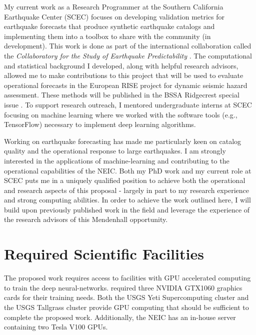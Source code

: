 \documentclass[12p]{article}
\begin{document}
My current work as a Research Programmer at the Southern California Earthquake Center (SCEC) focuses on developing
validation metrics for earthquake forecasts that produce synthetic earthquake catalogs and implementing them into a
toolbox to share with the community (in development). This work is done as part of the international collaboration
called the \emph{Collaboratory for the Study of Earthquake Predictability} \citep{Jordan2006, Schorlemmer2007b}. The
computational and statistical background I developed, along with helpful research advisors, allowed me to make
contributions to this project that will be used to evaluate operational forecasts in the European RISE project for
dynamic seismic hazard assessment. These methods will be published in the BSSA Ridgecrest special issue
\citep{Savran2020}. To support research outreach, I mentored undergraduate interns at SCEC focusing on machine learning where we worked with the software tools (e.g., TensorFlow) necessary to implement deep learning algorithms.

Working on earthquake forecasting has made me particularly keen on catalog quality and the operational response to large
earthquakes. I am strongly interested in the applications of machine-learning and contributing to the operational
capabilities of the NEIC. Both my PhD work and my current role at SCEC puts me in a uniquely qualified position to
achieve both the operational and research aspects of this proposal - largely in part to my research experience and
strong computing abilities. In order to achieve the work outlined here, I will build upon previously published work in
the field and leverage the experience of the research advisors of this Mendenhall opportunity.

\section{Required Scientific Facilities}
The proposed work requires access to facilities with GPU accelerated computing to train the deep neural-networks.
\citet{Ross2018b} required three NVIDIA GTX1060 graphics cards for their training needs. Both the USGS Yeti
Supercomputing cluster and the USGS Tallgrass cluster provide GPU computing that should be sufficient to complete the
proposed work. Additionally, the NEIC has an in-house server containing two Tesla V100 GPUs.



\end{document}
